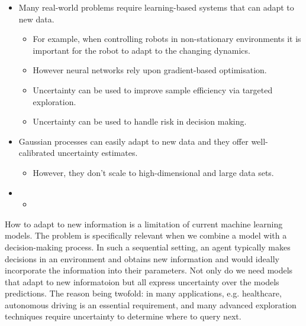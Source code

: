 \documentclass{article}
\begin{document}
\begin{itemize}
  \item Many real-world problems require learning-based systems that can adapt to new data.
  \begin{itemize}
    \item For example, when controlling robots in non-stationary environments it is important for the robot to adapt to the changing dynamics.
    \item However neural networks rely upon gradient-based optimisation.
    \item Uncertainty can be used to improve sample efficiency via targeted exploration.
    \item Uncertainty can be used to handle risk in decision making.
  \end{itemize}

  \item Gaussian processes can easily adapt to new data and they offer well-calibrated uncertainty estimates.
  \begin{itemize}
    \item However, they don't scale to high-dimensional and large data sets.
  \end{itemize}
  \item
  \begin{itemize}
    \item
  \end{itemize}
\end{itemize}



How to adapt to new information is a limitation of current machine learning models. The problem is specifically relevant when we combine a model with a decision-making process. In such a sequential setting, an agent typically makes decisions in an environment and obtains new information and would ideally incorporate the information into their parameters. Not only do we need models that adapt to new informatoion but all express uncertainty over the models predictions. The reason being twofold: in many applications, e.g. healthcare, autonomous driving is an essential requirement, and many advanced exploration techniques require uncertainty to determine where to query next.
\end{document}
